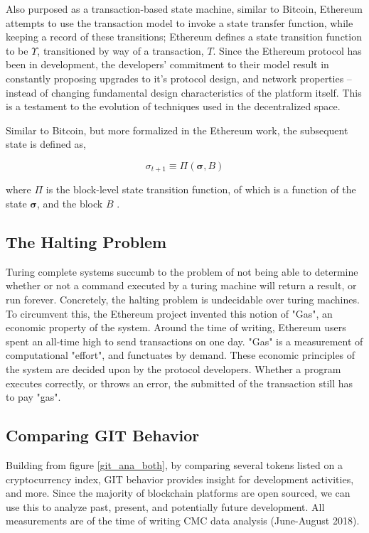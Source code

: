 \documentclass[12pt, titlepage, twocolumn]{report}
\begin{document}
Also purposed as a transaction-based state machine, similar to Bitcoin, Ethereum attempts to use the transaction model to invoke a state transfer function, while keeping a record of these transitions; Ethereum defines a state transition function to be \(  \Upsilon \), transitioned by way of a transaction, \(T\). Since the Ethereum protocol has been in development, the developers' commitment to their model result in constantly proposing upgrades to it's protocol design, and network properties -- instead of changing fundamental design characteristics of the platform itself. This is a testament to the evolution of techniques used in the decentralized space. 

Similar to Bitcoin, but more formalized in the Ethereum work, the subsequent state is defined as,

\begin{equation}
\sigma_{t+1} \equiv \Pi (\boldsymbol{\sigma}, B)
\end{equation}

where \(\Pi\) is the block-level state transition function, of which is a function of the state \(\boldsymbol{\sigma}\), and the block \(B\) \cite{yellowp}.


\subsection{The Halting Problem}
Turing complete systems succumb to the problem of not being able to determine whether or not a command executed by a turing machine will return a result, or run forever. Concretely, the halting problem is undecidable over turing machines. To circumvent this, the Ethereum project invented this notion of "Gas", an economic property of the system. Around the time of writing, Ethereum users spent an all-time high to send transactions on one day. "Gas" is a measurement of computational "effort", and functuates by demand. These economic principles of the system are decided upon by the protocol developers. Whether a program executes correctly, or throws an error, the submitted of the transaction still has to pay "gas". 

\subsection{Comparing GIT Behavior}

Building from figure \ref{git_ana_both}, by comparing several tokens listed on a cryptocurrency index, GIT behavior provides insight for development activities, and more. Since the majority of blockchain platforms are open sourced, we can use this to analyze past, present, and potentially future development. All measurements are of the time of writing CMC data analysis (June-August 2018).
\end{document}
